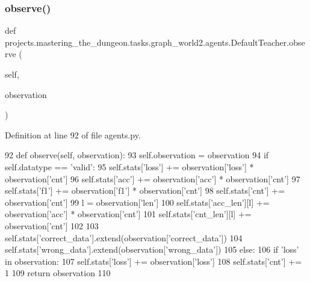 \subsubsection{\texorpdfstring{observe()}{observe()}}
{\footnotesize\ttfamily def projects.\+mastering\+\_\+the\+\_\+dungeon.\+tasks.\+graph\+\_\+world2.\+agents.\+Default\+Teacher.\+observe (\begin{DoxyParamCaption}\item[{}]{self,  }\item[{}]{observation }\end{DoxyParamCaption})}



Definition at line 92 of file agents.\+py.


\begin{DoxyCode}
92     \textcolor{keyword}{def }observe(self, observation):
93         self.observation = observation
94         \textcolor{keywordflow}{if} self.datatype == \textcolor{stringliteral}{'valid'}:
95             self.stats[\textcolor{stringliteral}{'loss'}] += observation[\textcolor{stringliteral}{'loss'}] * observation[\textcolor{stringliteral}{'cnt'}]
96             self.stats[\textcolor{stringliteral}{'acc'}] += observation[\textcolor{stringliteral}{'acc'}] * observation[\textcolor{stringliteral}{'cnt'}]
97             self.stats[\textcolor{stringliteral}{'f1'}] += observation[\textcolor{stringliteral}{'f1'}] * observation[\textcolor{stringliteral}{'cnt'}]
98             self.stats[\textcolor{stringliteral}{'cnt'}] += observation[\textcolor{stringliteral}{'cnt'}]
99             l = observation[\textcolor{stringliteral}{'len'}]
100             self.stats[\textcolor{stringliteral}{'acc\_len'}][l] += observation[\textcolor{stringliteral}{'acc'}] * observation[\textcolor{stringliteral}{'cnt'}]
101             self.stats[\textcolor{stringliteral}{'cnt\_len'}][l] += observation[\textcolor{stringliteral}{'cnt'}]
102 
103             self.stats[\textcolor{stringliteral}{'correct\_data'}].extend(observation[\textcolor{stringliteral}{'correct\_data'}])
104             self.stats[\textcolor{stringliteral}{'wrong\_data'}].extend(observation[\textcolor{stringliteral}{'wrong\_data'}])
105         \textcolor{keywordflow}{else}:
106             \textcolor{keywordflow}{if} \textcolor{stringliteral}{'loss'} \textcolor{keywordflow}{in} observation:
107                 self.stats[\textcolor{stringliteral}{'loss'}] += observation[\textcolor{stringliteral}{'loss'}]
108                 self.stats[\textcolor{stringliteral}{'cnt'}] += 1
109         \textcolor{keywordflow}{return} observation
110 
\end{DoxyCode}
